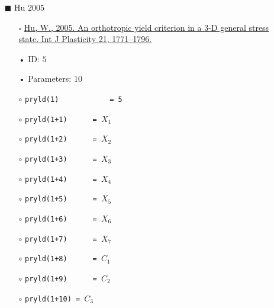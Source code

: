 \documentclass[11pt,a4paper,twoside,final,onecolumn,titlepage]{article}
\begin{document}
\newpage
\begin{itemize}
	\item[\tiny$\blacksquare$] Hu 2005
	\begin{itemize}
		\item[\tiny$\square$] {\small \href{https://doi.org/10.1016/j.ijplas.2004.11.004}{Hu, W., 2005. An orthotropic yield criterion in a 3-D general stress state. Int J Plasticity 21, 1771–1796.}}\\
		\item[•] ID: $5$
		\item[•] Parameters: $10$\\
		\item[$\circ$] \texttt{pryld(1)\,\,\,\,\,\,\,\,\,\,\,\,= 5}
		\item[$\circ$] \texttt{pryld(1+1)\,\,\,\,\,\,= $X_1$}
		\item[$\circ$] \texttt{pryld(1+2)\,\,\,\,\,\,= $X_2$}
		\item[$\circ$] \texttt{pryld(1+3)\,\,\,\,\,\,= $X_3$}
		\item[$\circ$] \texttt{pryld(1+4)\,\,\,\,\,\,= $X_4$}
		\item[$\circ$] \texttt{pryld(1+5)\,\,\,\,\,\,= $X_5$}
		\item[$\circ$] \texttt{pryld(1+6)\,\,\,\,\,\,= $X_6$}
		\item[$\circ$] \texttt{pryld(1+7)\,\,\,\,\,\,= $X_7$}
		\item[$\circ$] \texttt{pryld(1+8)\,\,\,\,\,\,= $C_1$}
		\item[$\circ$] \texttt{pryld(1+9)\,\,\,\,\,\,= $C_2$}
		\item[$\circ$] \texttt{pryld(1+10) = $C_3$}\\
	\end{itemize}
\end{itemize}
\end{document}

